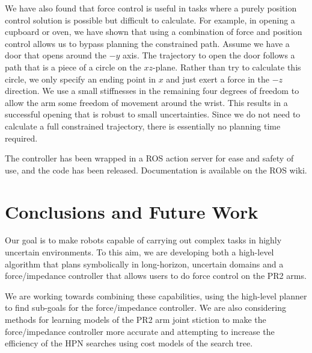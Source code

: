 \documentclass[letterpaper, 10 pt, conference]{ieeeconf}  %
\begin{document}
We have also found that force control is useful in tasks where a
purely position control solution is possible but difficult to
calculate.  For example, in opening a
cupboard or oven, we have shown 
that using a combination of force and position control allows us to
bypass planning the constrained path.  Assume we have a door that
opens around the $-y$ axis.  The trajectory to open the door follows a
path that is a piece of a circle on the $xz$-plane.  Rather than try
to calculate this circle, we only specify an ending point in $x$ and
just exert a force 
in the $-z$ direction.  We use a small stiffnesses in the remaining
four degrees
of freedom to allow the arm some freedom of movement around the
wrist.  This results in a successful opening that is
robust to small uncertainties.  Since we do not need to calculate a
full constrained trajectory, there is essentially no planning
time required.

The controller has been wrapped in a ROS action server for ease and
safety of use, and the code has been released.  Documentation is
available on the ROS wiki.

\section{Conclusions and Future Work}

Our goal is to make robots capable of carrying out complex tasks in
highly uncertain environments.  To this aim, we are developing both a
high-level algorithm 
that plans symbolically in long-horizon, uncertain domains and a
force/impedance controller that allows users to do force control on
the PR2 arms.  

We are working towards combining these capabilities, using the
high-level planner to find sub-goals for the force/impedance
controller.  We are also considering methods for learning models of
the PR2 arm joint stiction to make the force/impedance controller more
accurate and attempting to increase the efficiency of the HPN
searches using cost models of the search tree.
\end{document}
